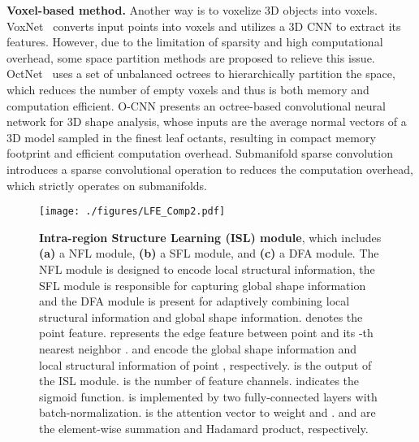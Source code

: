 \documentclass[journal]{IEEEtran}
\begin{document}
\textbf{Voxel-based method.} Another way is to voxelize 3D objects into voxels. VoxNet~\cite{maturana2015voxnet} converts input points into voxels and utilizes a 3D CNN to extract its features. However, due to the limitation of sparsity and high computational overhead, some space partition methods are proposed to relieve this issue. OctNet~\cite{riegler2017octnet} uses a set of unbalanced octrees to hierarchically partition the space, which reduces the number of empty voxels and thus is both memory and computation efficient. 
O-CNN presents an octree-based convolutional neural network for 3D shape analysis, whose inputs are the average normal vectors of a 3D model sampled in the finest leaf octants, resulting in compact memory footprint and efficient computation overhead.
Submanifold sparse convolution~\cite{graham20183d} introduces a sparse convolutional operation to reduces the computation overhead, which strictly operates on submanifolds. 

\begin{figure}
\begin{center}
    \texttt{[image: ./figures/LFE\_Comp2.pdf]}
\end{center}
\caption{\textbf{Intra-region Structure Learning (ISL) module}, which includes \textbf{(a)} a NFL module, \textbf{(b)} a SFL module, and \textbf{(c)} a DFA module. The NFL module is designed to encode local structural information, the SFL module is responsible for capturing global shape information and the DFA module is present for adaptively combining local structural information and global shape information.  denotes the point feature.  represents the edge feature between point  and its -th nearest neighbor .  and  encode the global shape information and local structural information of point , respectively.  is the output of the ISL module.  is the number of feature channels.  indicates the sigmoid function.  is implemented by two fully-connected layers with batch-normalization.  is the attention vector to weight  and .   and  are the element-wise summation and Hadamard product, respectively.
\label{Fig.LFE_Compare}}
\end{figure}
\end{document}
